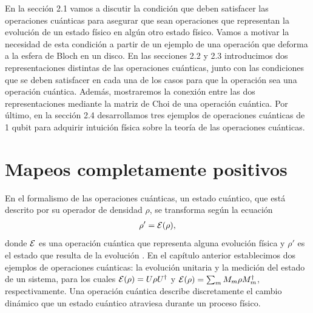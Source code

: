 En la sección 2.1 vamos a discutir la condición
que deben satisfacer las operaciones cuánticas para asegurar
que sean operaciones que representan la evolución de un estado físico 
en algún otro estado físico.
Vamos a motivar la necesidad de esta condición
a partir de un ejemplo de una operación que deforma a la esfera de
Bloch en un disco. En las secciones 2.2 y 2.3 introducimos dos 
representaciones distintas de las operaciones cuánticas, junto 
con las condiciones que se deben satisfacer en cada una de los
casos para que la operación sea una operación cuántica. 
Además, mostraremos la conexión entre 
las dos representaciones mediante la matriz de Choi de 
una operación cuántica. Por último, en la sección 2.4 
desarrollamos tres ejemplos de operaciones cuánticas de 1 qubit 
para adquirir intuición física sobre la teoría de las operaciones cuánticas.
\section{Mapeos completamente positivos} %
En el formalismo de las operaciones cuánticas, un estado cuántico,
que está descrito por su operador de densidad $\rho$,
se transforma según la ecuación 
\begin{align}
\rho' = \mathcal{E} (\rho)
\label{eq:E(rho)},
\end{align} 
donde $\mathcal{E}$ es una operación cuántica que representa alguna evolución 
física y $\rho'$ es el estado que resulta de la evolución 
\cite{nielsen_chuang_2011}. 
En el capítulo anterior  establecimos 
dos ejemplos de operaciones cuánticas: la evolución unitaria 
y la medición del estado de un sistema, 
para los cuales $\mathcal{E} \qty(\rho)=U\rho U^{\dagger}$ y 
$\mathcal{E}(\rho)=\sum_m M_m\rho M_m^{\dagger}$, respectivamente. 
Una operación cuántica describe discretamente 
el cambio dinámico que un estado cuántico 
atraviesa durante un proceso físico. 

